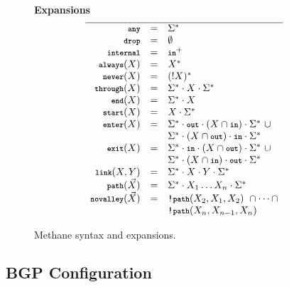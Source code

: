 \documentclass[twocolumn, openany]{sig-alternate-10pt}
\newcommand{\KW}[1]{\texttt{\small\bfseries{#1}}}
\newcommand{\Any}{\KW{any}}
\newcommand{\None}{\KW{drop}}
\newcommand{\In}{\KW{in}}
\newcommand{\Out}{\KW{out}}
\newcommand{\NOT}{\texttt{!}}
\newcommand{\Exit}{\KW{exit}}
\newcommand{\End}{\KW{end}}
\newcommand{\Start}{\KW{start}}
\newcommand{\Enter}{\KW{enter}}
\newcommand{\Internal}{\KW{internal}}
\newcommand{\Never}{\KW{never}}
\newcommand{\Always}{\KW{always}}
\newcommand{\Through}{\KW{through}}
\newcommand{\LinkKW}{\KW{link}}
\newcommand{\PathKW}{\KW{path}}
\newcommand{\Novalley}{\KW{novalley}}
\newcommand{\hdr}[2]{\flushleft \chdr{\hspace{5mm}#1}{#2}}
\newcommand{\chdr}[2]{\textbf{#1} {#2} \\ \centering}%
\begin{document}
\begin{figure*}[h!]
\begin{minipage}[t]{.45\linewidth}
  \end{minipage}
  ~~
  \vrule
  ~~
  \begin{minipage}[t]{.5\linewidth}\small
  \hdr{Expansions}{}
  \vspace*{-1\baselineskip}
  \[\begin{array}{rcl}
    \hline
    \Any               & = & \Sigma^* \\
    \None              & = & \emptyset \\
    \Internal          & = & \In^+ \\
    \Always(X)         & = & X^* \\
    \Never(X)          & = & (!X)^* \\
    \Through(X)        & = & \Sigma^* \cdot X \cdot \Sigma^* \\
    \End(X)            & = & \Sigma^* \cdot X \\
    \Start(X)          & = & X \cdot \Sigma^* \\
    \Enter(X)          & = & \Sigma^* \cdot \Out \cdot (X \cap \In) \cdot \Sigma^* ~ \cup \\
                       &   & \Sigma^* \cdot (X \cap \Out) \cdot \In \cdot \Sigma^* \\
    \Exit(X)           & = & \Sigma^* \cdot \In \cdot (X \cap \Out) \cdot \Sigma^* ~ \cup \\
                       &   & \Sigma^* \cdot (X \cap \In) \cdot \Out \cdot \Sigma^* \\
    \LinkKW(X,Y)       & = & \Sigma^* \cdot X \cdot Y \cdot \Sigma^* \\
    \PathKW(\vec{X})   & = & \Sigma^* \cdot X_1 \dots X_n \cdot \Sigma^* \\
    \Novalley(\vec{X}) & = & \NOT\PathKW(X_2,X_1,X_2) ~ \cap \dots \cap \\
                       &   & \NOT\PathKW(X_n,X_{n-1},X_n) \\
  \end{array} \]%

  \end{minipage}%

  \hrulefill%
  \vspace{1em}

  \caption{Methane syntax and expansions.}
  \label{fig:syntax}
\end{figure*}%



\subsection{BGP Configuration}
\end{document}
